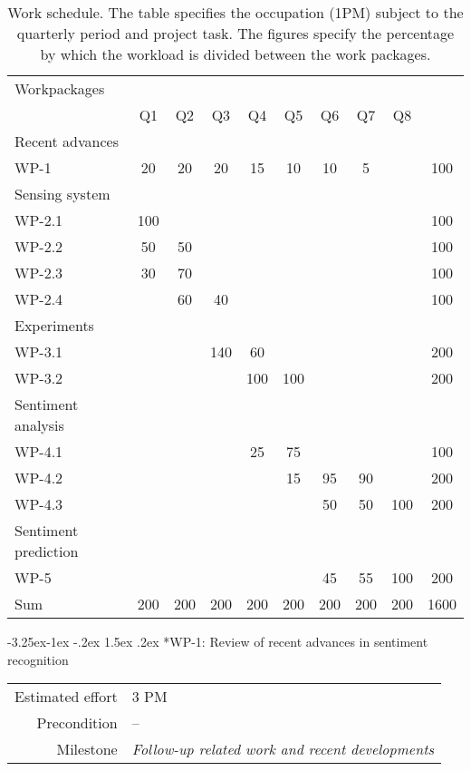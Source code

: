 \documentclass[12pt]{article}
\makeatletter
\renewcommand\paragraph{\@startsection{paragraph}{4}{\z@}%
  {-3.25ex\@plus -1ex \@minus -.2ex}%
  {1.5ex \@plus .2ex}%
  {\normalfont\normalsize\bfseries}}
\makeatother
\begin{document}
\begin{table}
\centering
\begin{small}
\begin{tabular}{|l||c|c|c|c|c|c|c|c||c|}
\hline
Workpackages&&&&&&&&&\\
	& Q1	&Q2	&Q3	&Q4	&Q5	&Q6	&Q7	&Q8	&\\\hline\hline
Recent advances& &	&	&	&	&	&	&	 &\\
WP-1	&20	&20	&20	&15	&10	&10	&5	&	 & 100\\\hline
Sensing system& &	&	&	&	&	&	&	 &\\
WP-2.1	&100	&	&	&	&	&	&	&	 & 100\\
WP-2.2	&50	&50	&	&	&	&	&	&	 & 100\\
WP-2.3	&30	&70	&	&	&	&	&	&	 & 100\\
WP-2.4	&	&60	&40	&	&	&	&	&	 & 100\\\hline
Experiments& &	&	&	&	&	&	&	&	\\
WP-3.1	&	&	&140	&60	&	&	&	&	 & 200\\
WP-3.2	&	&	&	&100	&100	&	&	&	 & 200\\\hline
Sentiment analysis& &	&	&	&	&	&	&	 &\\
WP-4.1	&	&	&	&25	&75	&	&	&	 & 100\\
WP-4.2	&	&	&	&	&15	&95	&90	&	 & 200\\
WP-4.3	&	&	&	&	&	&50	&50	&100	 & 200\\\hline
Sentiment prediction& &	&	&	&	&	&	&	 &\\
WP-5	&	&	&	&	&	&45	&55	&100	 & 200\\\hline
Sum	& 200	&200	&200	&200	&200	&200	&200	&200	 & 1600\\\hline
\end{tabular}
\end{small}
\caption{Work schedule. The table specifies the occupation (1PM) subject to the quarterly period and project task. 
The figures specify the percentage by which the workload is divided between the work packages.}
\label{tableGesamtueberblick}
\end{table}


\paragraph*{WP-1: Review of recent advances in sentiment recognition}
\begin{tabular}{rl}
 Estimated effort& 3 PM\\
 Precondition & --\\
 Milestone & \begin{minipage}[t]{12.2cm}
\textit{Follow-up related work and recent developments}\vspace{.2cm}
             \end{minipage}
\end{tabular}
\end{document}
